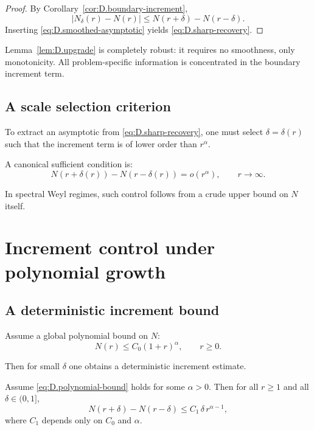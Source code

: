 \begin{proof}
By Corollary~\ref{cor:D.boundary-increment},
\[
|N_\delta(r)-N(r)|
\le
N(r+\delta)-N(r-\delta).
\]
Inserting \eqref{eq:D.smoothed-asymptotic} yields \eqref{eq:D.sharp-recovery}.
\end{proof}

Lemma~\ref{lem:D.upgrade} is completely robust: it requires no smoothness, only monotonicity.
All problem-specific information is concentrated in the boundary increment term.

\subsection{A scale selection criterion}
\label{subsec:D.scale-selection}

To extract an asymptotic from \eqref{eq:D.sharp-recovery}, one must select $\delta=\delta(r)$ such that
the increment term is of lower order than $r^\alpha$.

A canonical sufficient condition is:
\begin{equation}
\label{eq:D.increment-negligible}
N(r+\delta(r))-N(r-\delta(r))=o(r^\alpha),
\qquad r\to\infty.
\end{equation}

In spectral Weyl regimes, such control follows from a crude upper bound on $N$ itself.

\section{Increment control under polynomial growth}
\label{sec:D.polynomial-growth}

\subsection{A deterministic increment bound}
\label{subsec:D.increment-bound}

Assume a global polynomial bound on $N$:
\begin{equation}
\label{eq:D.polynomial-bound}
N(r)\le C_0(1+r)^\alpha,
\qquad r\ge 0.
\end{equation}

Then for small $\delta$ one obtains a deterministic increment estimate.

\begin{lemma}
\label{lem:D.poly-increment}
Assume \eqref{eq:D.polynomial-bound} holds for some $\alpha>0$.
Then for all $r\ge 1$ and all $\delta\in(0,1]$,
\begin{equation}
\label{eq:D.increment-poly}
N(r+\delta)-N(r-\delta)
\le
C_1\,\delta\,r^{\alpha-1},
\end{equation}
where $C_1$ depends only on $C_0$ and $\alpha$.
\end{lemma}

